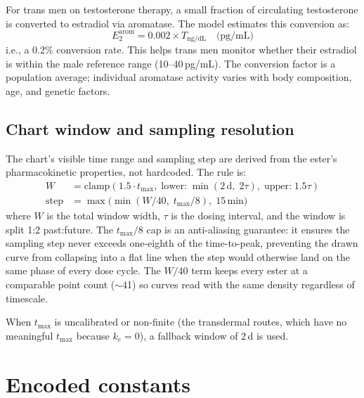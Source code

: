 \documentclass[11pt,a4paper]{article}
\begin{document}
For trans men on testosterone therapy, a small fraction of circulating
testosterone is converted to estradiol via aromatase. The model
estimates this conversion as:
\begin{equation}
E_2^{\text{arom}} = 0.002 \times T_{\text{ng/dL}} \quad \text{(pg/mL)}
\label{eq:aromatization}
\end{equation}
i.e., a 0.2\% conversion rate. This helps trans men monitor whether
their estradiol is within the male reference range (10--40\,pg/mL). The
conversion factor is a population average; individual aromatase activity
varies with body composition, age, and genetic factors.

\subsection{Chart window and sampling resolution}
\label{sec:chart_window}

The chart's visible time range and sampling step are derived from the
ester's pharmacokinetic properties, not hardcoded. The rule is:
\begin{align}
W    &= \mathrm{clamp}(1.5 \cdot t_{\max},\; \text{lower:}\;\min(2\,\text{d},\; 2\tau),\; \text{upper:}\;1.5\tau) \label{eq:window} \\
\text{step} &= \max\bigl(\min(W/40,\; t_{\max}/8),\; 15\,\text{min}\bigr) \label{eq:step}
\end{align}
where $W$ is the total window width, $\tau$ is the dosing interval, and
the window is split 1:2 past:future. The $t_{\max}/8$ cap is an
anti-aliasing guarantee: it ensures the sampling step never exceeds
one-eighth of the time-to-peak, preventing the drawn curve from
collapsing into a flat line when the step would otherwise land on the
same phase of every dose cycle. The $W/40$ term keeps every ester at a
comparable point count ($\sim$41) so curves read with the same density
regardless of timescale.

When $t_{\max}$ is uncalibrated or non-finite (the transdermal routes,
which have no meaningful $t_{\max}$ because $k_e = 0$), a fallback
window of 2\,d is used.

\section{Encoded constants}
\label{sec:constants}
\end{document}
